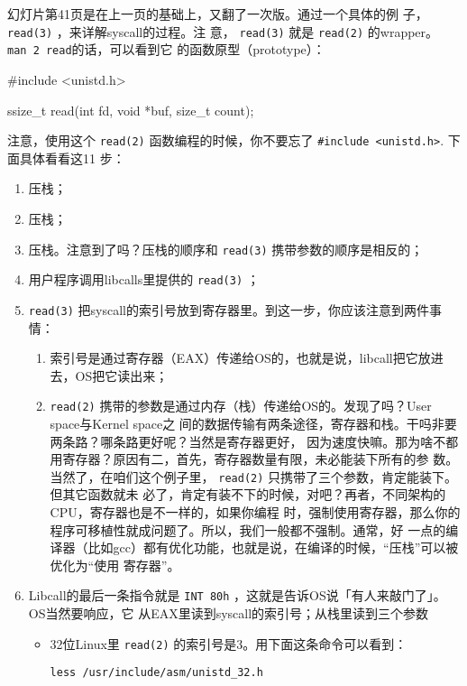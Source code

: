 \documentclass{wx672ctexart}
\newcommand\mpic[1]{%
  \marginpar{\texttt{[image: thumbnails/\#1]}}}
\begin{document}
\mpic{pg_0041}幻灯片第41页是在上一页的基础上，又翻了一次版。通过一个具体的例
子， \texttt{read(3)} ，来详解syscall的过程。注
意， \texttt{read(3)} 就是 \texttt{read(2)} 的wrapper。 \texttt{man 2 read}的话，可以看到它
的函数原型（prototype）：
\begin{ccode}
#include <unistd.h>

ssize_t read(int fd, void *buf, size_t count);
\end{ccode}
注意，使用这个 \texttt{read(2)} 函数编程的时候，你不要忘了 \texttt{\#include <unistd.h>}. 下面具体看看这11
步：
\begin{enumerate}
\item 压栈；
\item 压栈；
\item 压栈。注意到了吗？压栈的顺序和 \texttt{read(3)} 携带参数的顺序是相反的；
\item 用户程序调用libcalls里提供的 \texttt{read(3)} ；
\item \texttt{read(3)} 把syscall的索引号放到寄存器里。到这一步，你应该注意到两件事情：
\begin{enumerate}
\item 索引号是通过寄存器（EAX）传递给OS的，也就是说，libcall把它放进去，OS把它读出来；
\item \texttt{read(2)} 携带的参数是通过内存（栈）传递给OS的。发现了吗？User space与Kernel space之
间的数据传输有两条途径，寄存器和栈。干吗非要两条路？哪条路更好呢？当然是寄存器更好，
因为速度快嘛。那为啥不都用寄存器？原因有二，首先，寄存器数量有限，未必能装下所有的参
数。当然了，在咱们这个例子里， \texttt{read(2)} 只携带了三个参数，肯定能装下。但其它函数就未
必了，肯定有装不下的时候，对吧？再者，不同架构的CPU，寄存器也是不一样的，如果你编程
时，强制使用寄存器，那么你的程序可移植性就成问题了。所以，我们一般都不强制。通常，好
一点的编译器（比如gcc）都有优化功能，也就是说，在编译的时候，“压栈”可以被优化为“使用
寄存器”。
\end{enumerate}
\item Libcall的最后一条指令就是 \texttt{INT 80h} ，这就是告诉OS说「有人来敲门了」。OS当然要响应，它
从EAX里读到syscall的索引号；从栈里读到三个参数
\begin{itemize}
\item 32位Linux里 \texttt{read(2)} 的索引号是3。用下面这条命令可以看到：
\begin{verbatim}
less /usr/include/asm/unistd_32.h
\end{verbatim}


\end{itemize}
\end{enumerate}
\end{document}
